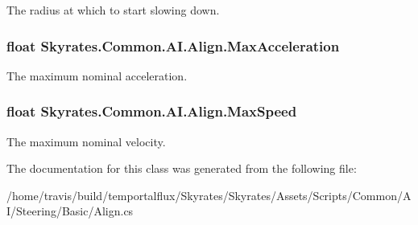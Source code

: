 The radius at which to start slowing down. 

\hypertarget{class_skyrates_1_1_common_1_1_a_i_1_1_align_a988e919f26229016a5be5d75a4a255c4}{
\subsubsection[{Max\-Acceleration}]{\setlength{\rightskip}{0pt plus 5cm}float Skyrates.\-Common.\-A\-I.\-Align.\-Max\-Acceleration}}\label{class_skyrates_1_1_common_1_1_a_i_1_1_align_a988e919f26229016a5be5d75a4a255c4}


The maximum nominal acceleration. 

\hypertarget{class_skyrates_1_1_common_1_1_a_i_1_1_align_a9eaa68127197df193b1ce3cd99492862}{
\subsubsection[{Max\-Speed}]{\setlength{\rightskip}{0pt plus 5cm}float Skyrates.\-Common.\-A\-I.\-Align.\-Max\-Speed}}\label{class_skyrates_1_1_common_1_1_a_i_1_1_align_a9eaa68127197df193b1ce3cd99492862}


The maximum nominal velocity. 



The documentation for this class was generated from the following file\-:\begin{DoxyCompactItemize}
\item 
/home/travis/build/temportalflux/\-Skyrates/\-Skyrates/\-Assets/\-Scripts/\-Common/\-A\-I/\-Steering/\-Basic/Align.\-cs\end{DoxyCompactItemize}
